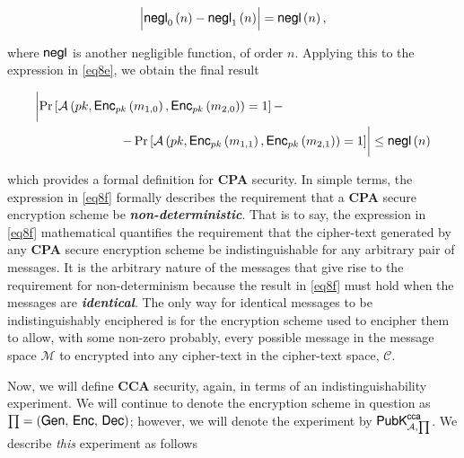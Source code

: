 \documentclass[../CryptoHW3.tex]{subfiles}
\begin{document}
\begin{flushleft}
\begin{align*}
  \Bigl| \text{{\fontfamily{phv}\selectfont negl}}_0 \left( n \right) - \text{{\fontfamily{phv}\selectfont negl}}_1 \left( n \right) \Bigr| = \text{{\fontfamily{phv}\selectfont negl}} \left( n \right),
\end{align*}

where $\text{{\fontfamily{phv}\selectfont negl}}$ is another negligible function, of order $n$.  Applying this to the expression in \ref{eq8e}, we obtain the final result

\begin{align}
  &\biggl| \Pr \left[ \mathcal{A} \left( pk,  \text{{\fontfamily{phv}\selectfont Enc}}_{pk} \left( m_{1, 0} \right), \text{{\fontfamily{phv}\selectfont Enc}}_{pk} \left( m_{2, 0} \right) \right) = 1 \right] - \biggr. \notag \\
  &\biggl. \qquad \qquad \qquad \quad - \Pr \left[ \mathcal{A} \left( pk,  \text{{\fontfamily{phv}\selectfont Enc}}_{pk} \left( m_{1, 1} \right), \text{{\fontfamily{phv}\selectfont Enc}}_{pk} \left( m_{2, 1} \right) \right) = 1 \right] \biggr| \leq \text{{\fontfamily{phv}\selectfont negl}} \left( n \right) \label{eq8f}
\end{align}

which provides a formal definition for \textbf{CPA} security.  In simple terms, the expression in \ref{eq8f} formally describes the requirement that a \textbf{CPA} secure encryption scheme be \textbf{\emph{non-deterministic}}. That is to say, the expression in \ref{eq8f} mathematical quantifies the requirement that the cipher-text generated by any \textbf{CPA} secure encryption scheme be indistinguishable for any arbitrary pair of messages.  It is the arbitrary nature of the messages that give rise to the requirement for non-determinism because the result in \ref{eq8f} must hold when the messages are \textbf{\emph{identical}}.  The only way for identical messages to be indistinguishably enciphered is for the encryption scheme used to encipher them to allow, with some non-zero probably, every possible message in the message space $\mathcal{M}$ to encrypted into any cipher-text in the cipher-text space, $\mathcal{C}$. \newline


\vspace{0.10in}


Now, we will define \textbf{CCA} security, again, in terms of an indistinguishability experiment. We will continue to denote the encryption scheme in question as $\prod = \left( \text{{\fontfamily{phv}\selectfont Gen}}, \, \text{{\fontfamily{phv}\selectfont Enc}}, \, \text{{\fontfamily{phv}\selectfont Dec}} \right)$; however, we will denote the experiment by $\text{{\fontfamily{phv}\selectfont PubK}}^{\text{{\fontfamily{phv}\selectfont cca}}}_{\mathcal{A}, \prod}$.  We describe \emph{this} experiment as follows \newline



\end{flushleft}
\end{document}
